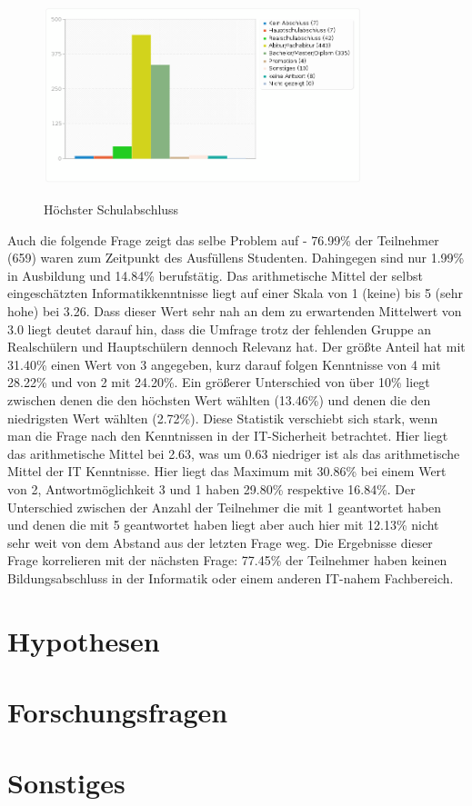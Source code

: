 \begin{figure}[H]
\centering
\includegraphics[scale=0.55]{images/schulabschluss}\\
\caption{Höchster Schulabschluss}\label{schulabschluss}
\end{figure}
Auch die folgende Frage zeigt das selbe Problem auf - 76.99\% der Teilnehmer (659) waren zum Zeitpunkt des Ausfüllens Studenten. Dahingegen sind nur 1.99\% in Ausbildung und 14.84\% berufstätig.
Das arithmetische Mittel der selbst eingeschätzten Informatikkenntnisse liegt auf einer Skala von 1 (keine) bis 5 (sehr hohe) bei 3.26. Dass dieser Wert sehr nah an dem zu erwartenden Mittelwert von 3.0 liegt deutet darauf hin, dass die Umfrage trotz der fehlenden Gruppe an Realschülern und Hauptschülern dennoch Relevanz hat. Der größte Anteil hat mit 31.40\% einen Wert von 3 angegeben, kurz darauf folgen Kenntnisse von 4 mit 28.22\% und von 2 mit 24.20\%. Ein größerer Unterschied von über 10\% liegt zwischen denen die den höchsten Wert wählten (13.46\%) und denen die den niedrigsten Wert wählten (2.72\%).
Diese Statistik verschiebt sich stark, wenn man die Frage nach den Kenntnissen in der IT-Sicherheit betrachtet. Hier liegt das arithmetische Mittel bei 2.63, was um 0.63 niedriger ist als das arithmetische Mittel der IT Kenntnisse. Hier liegt das Maximum mit 30.86\% bei einem Wert von 2, Antwortmöglichkeit 3 und 1 haben 29.80\% respektive 16.84\%. Der Unterschied zwischen der Anzahl der Teilnehmer die mit 1 geantwortet haben und denen die mit 5 geantwortet haben liegt aber auch hier mit 12.13\% nicht sehr weit von dem Abstand aus der letzten Frage weg.
Die Ergebnisse dieser Frage korrelieren mit der nächsten Frage: 77.45\% der Teilnehmer haben keinen Bildungsabschluss in der Informatik oder einem anderen IT-nahem Fachbereich.

\section{Hypothesen}

\section{Forschungsfragen}

\section{Sonstiges}
